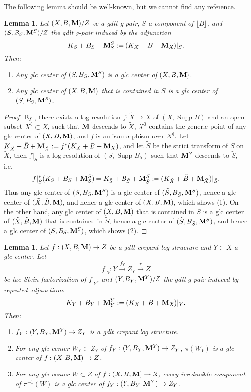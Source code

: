 \documentclass[11pt]{amsart}
\numberwithin{equation}{section}
\newcommand{\Mm}{{\bf{M}}}
\newcommand{\Supp}{\operatorname{Supp}}
\newtheorem{lem}[thm]{Lemma}
\theoremstyle{definition}
\theoremstyle{definition}
\theoremstyle{definition}
\begin{document}
The following lemma should be well-known, but we cannot find any reference.
\begin{lem}\label{lem: inversion of adjunction}
  Let $(X,B,\Mm)/Z$ be a gdlt g-pair, $S$ a component of $\lfloor
  B\rfloor$, and $(S,B_S,\Mm^S)/Z$ the gdlt g-pair induced by the adjunction
  $$K_S+B_S+\Mm^S_S:=(K_X+B+\Mm_X)|_S.$$
  Then:
  \begin{enumerate}
    \item Any glc center of $(S,B_S,\Mm^S)$ is a glc center of $(X,B,\Mm)$.
    \item Any glc center of $(X,B,\Mm)$ that is contained in $S$ is a
      glc center of $(S,B_S,\Mm^S)$.
  \end{enumerate}
\end{lem}
\begin{proof}
  By \cite[Theorem 6.1]{Has22}, there exists a log resolution $f:
  \tilde X\rightarrow X$ of $(X,\Supp B)$ and an open subset
  $X^0\subset X$, such that $\Mm$ descends to $\tilde X$, $X^0$
  contains the generic point of any glc center of $(X,B,\Mm)$, and
  $f$ is an isomorphism over $X^0$. Let $K_{\tilde X}+\tilde
  B+\Mm_{\tilde X}:=f^*(K_X+B+\Mm_X)$, and let $\tilde S$ be the
  strict transform of $S$ on $\tilde X$, then
  $f|_{\tilde S}$ is a log resolution of $(S,\Supp B_S)$ such that
  $\Mm^S$ descends to $\tilde S$, i.e.
  $$f|_{\tilde S}^*(K_S+B_S+\Mm^S_S)=K_{\tilde S}+B_{\tilde
  S}+\Mm^S_{\tilde S}:=(K_{\tilde X}+\tilde B+\Mm_{\tilde X})|_{\tilde S}.$$
  Thus any glc center of $(S,B_S,\Mm^S)$ is a glc center of $(\tilde
  S,B_{\tilde S},\Mm^S)$, hence a glc center of $(\tilde X,\tilde
  B,\Mm)$, and hence a glc center of $(X,B,\Mm)$, which shows (1). On
  the other hand, any glc center of $(X,B,\Mm)$ that is contained in
  $S$ is a glc center of $(\tilde X,\tilde B,\Mm)$ that is contained
  in $\tilde S$, hence a glc center of $(\tilde S,B_{\tilde
  S},\Mm^S)$, and hence a glc center of $(S,B_S,\Mm^S)$, which shows (2).
\end{proof}

\begin{lem}\label{lem: gdlt crepant log structure is compatible under
  subadjunction}
  Let $f: (X,B,\Mm)\to Z$ be a gdlt crepant log structure and
  $Y\subset X$ a glc center. Let
  $$
  f|_Y: Y\xrightarrow{f_Y}Z_Y\xrightarrow{\pi} Z
  $$
  be the Stein factorization of $f|_Y$, and $(Y,B_Y,\Mm^Y)/Z$ the
  gdlt g-pair induced by repeated adjunctions
  $$K_Y+B_Y+\Mm_Y^Y:=(K_X+B+\Mm_X)|_Y.$$
  Then:
  \begin{enumerate}
    \item $f_Y: (Y,B_Y,\Mm^Y)\rightarrow Z_Y$ is a gdlt crepant log structure.
    \item For any glc center $W_Y\subset Z_Y$ of $f_Y:
      (Y,B_Y,\Mm^Y)\rightarrow Z_Y$, $\pi(W_Y)$ is a glc center of
      $f: (X,B,\Mm)\rightarrow Z$.
    \item For any glc center $W\subset Z$ of $f: (X,B,\Mm)\rightarrow
      Z$, every irreducible component of $\pi^{-1}(W)$ is a glc
      center of  $f_Y: (Y,B_Y,\Mm^Y)\rightarrow Z_Y$.
  \end{enumerate}
\end{lem}
\end{document}
